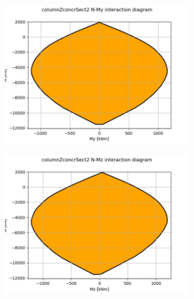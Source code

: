 \begin{center}
\includegraphics[width=80mm]{results/graphics/sections/columnZconcrSect2NMy}
\end{center}
\begin{center}
\includegraphics[width=80mm]{results/graphics/sections/columnZconcrSect2NMz}
\end{center}
